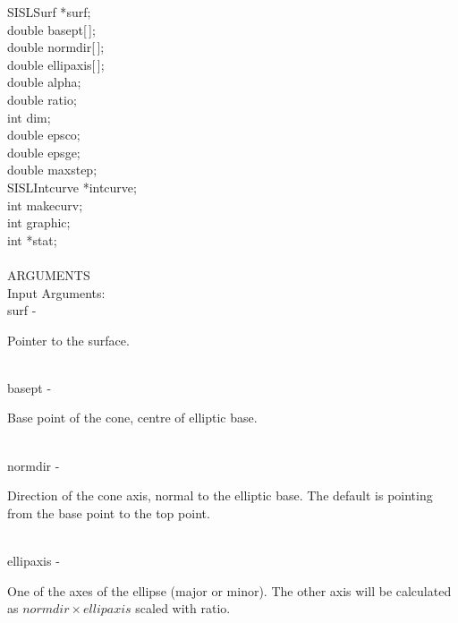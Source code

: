                 \>\>    SISLSurf        \>      *{\fov surf};\\
                \>\>    double  \>      {\fov basept}[\,];\\
                \>\>    double  \>      {\fov normdir}[\,];\\
                \>\>    double  \>      {\fov ellipaxis}[\,];\\
                \>\>    double  \>      {\fov alpha};\\
                \>\>    double  \>      {\fov ratio};\\
                \>\>    int     \>      {\fov dim};\\
                \>\>    double  \>      {\fov epsco};\\
                \>\>    double  \>      {\fov epsge};\\
                \>\>    double  \>      {\fov maxstep};\\
                \>\>    SISLIntcurve\>  *{\fov intcurve};\\
                \>\>    int     \>      {\fov makecurv};\\
                \>\>    int     \>      {\fov graphic};\\
                \>\>    int     \>      *{\fov stat};\\
\\
ARGUMENTS\\
        \>Input Arguments:\\
        \>\>    {\fov surf}\> - \>      \begin{minipg2}
                                Pointer to the surface.
                                \end{minipg2}\\
        \>\>    {\fov basept}\> - \>    \begin{minipg2}
                                Base point of the cone, centre of elliptic base.
                                \end{minipg2}\\
        \>\>    {\fov normdir}\> - \>   \begin{minipg2}
                                Direction of the cone axis, normal to the elliptic base. The default is pointing from the base point to the top point.
                                \end{minipg2}\\[0.3ex]
        \>\>    {\fov ellipaxis}\> - \> \begin{minipg2}
                                One of the axes of the ellipse (major or
                                minor).
                                The other axis will be calculated as
                                $normdir\times ellipaxis$ scaled with
                                {\fov ratio}.
                                \end{minipg2}\\[0.8ex]

